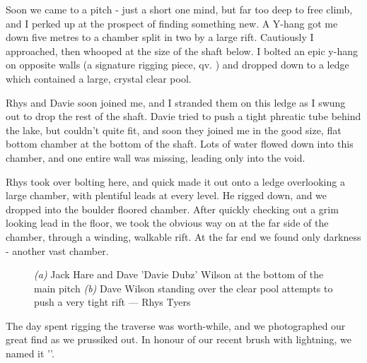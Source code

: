 Soon we came to a pitch - just a short one mind, but far too deep to free climb, and I perked up at the prospect of finding something new. A Y-hang got me down five metres to a chamber split in two by a large rift. Cautiously I approached, then whooped at the size of the shaft below. I bolted an epic y-hang on opposite walls (a signature rigging piece, qv. ) and dropped down to a ledge which contained a large, crystal clear pool.

Rhys and Davie soon joined me, and I stranded them on this ledge as I swung out to drop the rest of the shaft. Davie tried to push a tight phreatic tube behind the lake, but couldn’t quite fit, and soon they joined me in the good size, flat bottom chamber at the bottom of the shaft. Lots of water flowed down into this chamber, and one entire wall was missing, leading only into the void.

Rhys took over bolting here, and quick made it out onto a ledge overlooking a large chamber, with plentiful leads at every level. He rigged down, and we dropped into the boulder floored chamber. After quickly checking out a grim looking lead in the floor, we took the obvious way on at the far side of the chamber, through a winding, walkable rift. At the far end we found only darkness - another vast chamber.


\begin{figure}[t!]
\checkoddpage \ifoddpage \forcerectofloat \else \forceversofloat \fi
\centering
\begin{subfigure}{0.667\textwidth}
        \caption{}
\end{subfigure}\hfill
\begin{subfigure}{0.31\textwidth}
 \caption{}\label{Crystal pool}
\end{subfigure}
\caption{\emph{(a)} Jack Hare and Dave 'Davie Dubz' Wilson at the bottom of the \protect{} main pitch \emph{(b)} Dave Wilson standing over the clear pool attempts to push a very tight rift --- Rhys Tyers}
\label{new figure}
\end{figure}

The day spent rigging the traverse was worth-while, and we photographed our great find as we prussiked out. In honour of our recent brush with lightning, we named it ''. 



